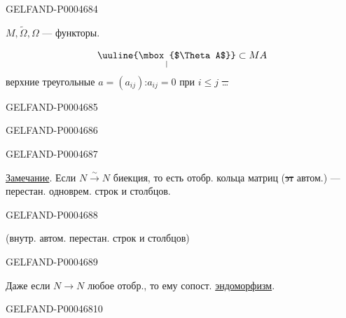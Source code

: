 \begin{GelfandAdjacentEvidence}{GELFAND-P000468}{4}


$M,\widetilde\Omega,\Omega$ — функторы.

\[
\underset{\vert}{\text{\uuline{\mbox{$\Theta A$}}}}\subset MA
\]
верхние треугольные $a=(a_{ij})$:\quad $a_{ij}=0$ при $i\le j$ \sout{\ldots}
\end{GelfandAdjacentEvidence}
\begin{GelfandAdjacentEvidence}{GELFAND-P000468}{5}

\end{GelfandAdjacentEvidence}
\begin{GelfandAdjacentEvidence}{GELFAND-P000468}{6}

\end{GelfandAdjacentEvidence}
\begin{GelfandAdjacentEvidence}{GELFAND-P000468}{7}


\underline{Замечание}. Если $N\xrightarrow{\sim}N$ биекция, то есть отобр. кольца матриц
(\sout{эт} автом.) — перестан. одноврем. строк и столбцов.
\end{GelfandAdjacentEvidence}
\begin{GelfandAdjacentEvidence}{GELFAND-P000468}{8}

(внутр. автом. перестан. строк и столбцов)
\end{GelfandAdjacentEvidence}
\begin{GelfandAdjacentEvidence}{GELFAND-P000468}{9}


Даже если $N\longrightarrow N$ любое отобр., то ему сопост. \underline{эндоморфизм}.
\end{GelfandAdjacentEvidence}
\begin{GelfandAdjacentEvidence}{GELFAND-P000468}{10}

\end{GelfandAdjacentEvidence}
